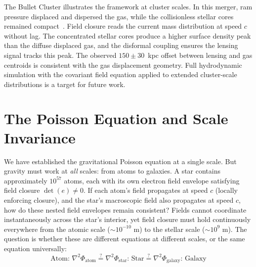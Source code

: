 \documentclass[aps,prd,preprint,superscriptaddress,showpacs,preprintnumbers,amsmath,amssymb,nofootinbib]{revtex4-2}
\begin{document}
The Bullet Cluster illustrates the framework at cluster scales. In this merger, ram pressure displaced and dispersed the gas, while the collisionless stellar cores remained compact~\cite{clowe2006}. Field closure reads the current mass distribution at speed $c$ without lag. The concentrated stellar cores produce a higher surface density peak than the diffuse displaced gas, and the disformal coupling ensures the lensing signal tracks this peak. The observed $150 \pm 30$~kpc offset between lensing and gas centroids is consistent with the gas displacement geometry. Full hydrodynamic simulation with the covariant field equation applied to extended cluster-scale distributions is a target for future work.

\section{The Poisson Equation and Scale Invariance}
\label{sec:poisson-scale-invariance}


We have established the gravitational Poisson equation at a single scale. But gravity must work at \emph{all} scales: from atoms to galaxies. A star contains approximately $10^{57}$ atoms, each with its own electron field envelope satisfying field closure $\det(e) \neq 0$. If each atom's field propagates at speed $c$ (locally enforcing closure), and the star's macroscopic field also propagates at speed $c$, how do these nested field envelopes remain consistent? Fields cannot coordinate instantaneously across the star's interior, yet field closure must hold continuously everywhere from the atomic scale ($\sim 10^{-10}$ m) to the stellar scale ($\sim 10^9$ m). The question is whether these are different equations at different scales, or the same equation universally:
\begin{equation}
\text{Atom: } \nabla^2\Phi_{\text{atom}} \stackrel{?}{=} \nabla^2\Phi_{\text{star}} \text{: Star} \stackrel{?}{=} \nabla^2\Phi_{\text{galaxy}} \text{: Galaxy}
\label{eq:scaling-question}
\end{equation}
\end{document}
